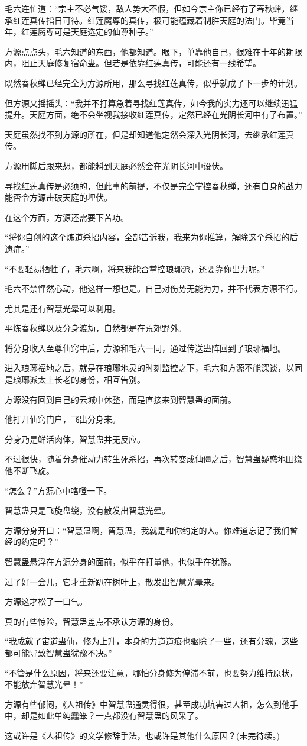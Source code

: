 \begin{this_body}
毛六连忙道：“宗主不必气馁，敌人势大不假，但如今宗主你已经有了春秋蝉，继承红莲真传指日可待。红莲魔尊的真传，极可能蕴藏着制胜天庭的法门。毕竟当年，红莲魔尊可是天庭选定的仙尊种子。”

方源点点头，毛六知道的东西，他都知道。眼下，单靠他自己，很难在十年的期限内，阻止天庭修复宿命蛊。但若是依靠红莲真传，可能还有一线希望。

既然春秋蝉已经完全为方源所用，那么寻找红莲真传，似乎就成了下一步的计划。

但方源又摇摇头：“我并不打算急着寻找红莲真传，如今我的实力还可以继续迅猛提升。天庭方面，绝不会坐视我接收红莲真传，定然已经在光阴长河中有了布置。”

天庭虽然找不到方源的所在，但是却知道他定然会深入光阴长河，去继承红莲真传。

方源用脚后跟来想，都能料到天庭必然会在光阴长河中设伏。

寻找红莲真传是必须的，但此事的前提，不仅是完全掌控春秋蝉，还有自身的战力能否令方源击破天庭的埋伏。

在这个方面，方源还需要下苦功。

“将你自创的这个炼道杀招内容，全部告诉我，我来为你推算，解除这个杀招的后遗症。”

“不要轻易牺牲了，毛六啊，将来我能否掌控琅琊派，还要靠你出力呢。”

毛六不禁怦然心动，他这样一想也是。自己对伤势无能为力，并不代表方源不行。

尤其是还有智慧光晕可以利用。

平炼春秋蝉以及分身渡劫，自然都是在荒郊野外。

将分身收入至尊仙窍中后，方源和毛六一同，通过传送蛊阵回到了琅琊福地。

进入琅琊福地之后，就是在琅琊地灵的时刻监控之下，毛六和方源不能深谈，以同是琅琊派太上长老的身份，相互告别。

方源没有回到自己的云城中休整，而是直接来到智慧蛊的面前。

他打开仙窍门户，飞出分身来。

分身乃是鲜活肉体，智慧蛊并无反应。

不过很快，随着分身催动力转生死杀招，再次转变成仙僵之后，智慧蛊疑惑地围绕他不断飞旋。

“怎么？”方源心中咯噔一下。

智慧蛊只是飞旋盘绕，没有散发出智慧光晕。

方源分身开口：“智慧蛊啊，智慧蛊，我就是和你约定的人。你难道忘记了我们曾经的约定吗？”

智慧蛊悬浮在方源分身的面前，似乎在打量他，也似乎在犹豫。

过了好一会儿，它才重新趴在树叶上，散发出智慧光晕来。

方源这才松了一口气。

真的有些惊险，智慧蛊差点不承认方源的身份。

“我成就了宙道蛊仙，修为上升，本身的力道道痕也驱除了一些，还有分魂，这些都可能导致智慧蛊犹豫不决。”

“不管是什么原因，将来还要注意，哪怕分身修为停滞不前，也要努力维持原状，不能放弃智慧光晕！”

方源有些郁闷，《人祖传》中智慧蛊通灵得很，甚至成功坑害过人祖，怎么到他手中，却是如此单纯蠢笨？一点都没有智慧蛊的风采了。

这或许是《人祖传》的文学修辞手法，也或许是其他什么原因？(未完待续。)

\end{this_body}

